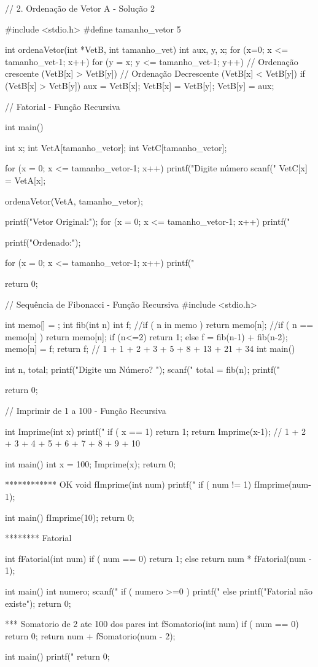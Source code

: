 // 2. Ordenação de Vetor A - Solução 2

#include <stdio.h>
#define tamanho_vetor 5

    int ordenaVetor(int *VetB, int tamanho_vet){
    int aux, y, x;
    for (x=0; x <= tamanho_vet-1; x++) {
        for (y = x; y <= tamanho_vet-1; y++) {
            // Ordenação crescente   (VetB[x] > VetB[y])
            // Ordenação Decrescente (VetB[x] < VetB[y])
            if (VetB[x] > VetB[y]) {
                aux = VetB[x];
                VetB[x] = VetB[y];
                VetB[y] = aux;
            }
        }
    }
}

// Fatorial - Função Recursiva

int main()
{   int x;
    int VetA[tamanho_vetor];
    int VetC[tamanho_vetor];

    for (x = 0; x <= tamanho_vetor-1; x++){
        printf("Digite número %
        scanf("%
        VetC[x] = VetA[x];
    }
    
    ordenaVetor(VetA, tamanho_vetor);
    
    printf("Vetor Original:");
    for (x = 0; x <= tamanho_vetor-1; x++){
        printf("%
    }
    
    printf("\nVetor Ordenado:");

    for (x = 0; x <= tamanho_vetor-1; x++){
        printf("%
    }

    return 0;
}

// Sequência de Fibonacci - Função Recursiva
#include <stdio.h>

int memo[] = {};
int fib(int n) {
    int f;
    //if ( n in memo ) return memo[n];
    //if ( n == memo[n] ) return memo[n];
    if (n<=2) return 1;
    else f = fib(n-1) + fib(n-2);
    memo[n] = f;
    return f;
}
// 1 + 1 + 2 + 3 + 5 + 8 + 13 + 21 + 34
int main()
{   int n, total;
    printf("Digite um Número? ");
    scanf("%
    total = fib(n);
    printf("%

    return 0;
}

// Imprimir de 1 a 100 - Função Recursiva

int Imprime(int x){
    printf("%
    if ( x == 1) return 1;
    return Imprime(x-1);
}
// 1 + 2 + 3 + 4 + 5 + 6 + 7 + 8 + 9 + 10

int main()
{  int x = 100;
    Imprime(x);
    return 0;
}

************ OK 
void fImprime(int num) {
    printf("%
    if ( num != 1) 
      fImprime(num-1);
}

int main()
{   fImprime(10);
    return 0;
}

******** Fatorial

int fFatorial(int num) {
    if ( num == 0) return 1;
    else return num * fFatorial(num - 1);
}

int main()
{   int numero;
    scanf("%
    if ( numero >=0 )
	  printf("%
	else
	  printf("Fatorial não existe");
    return 0;
}

*** Somatorio de 2 ate 100 dos pares
int fSomatorio(int num) {
    if ( num == 0) return 0;
	 return num + fSomatorio(num - 2);
}

int main()
{  	printf("%
    return 0;
}
